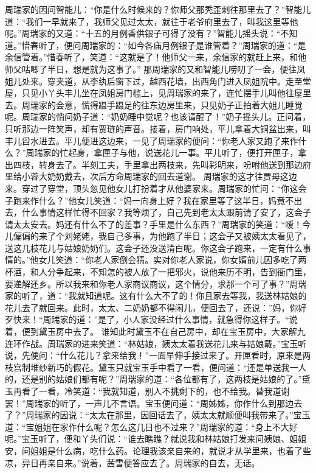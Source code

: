 \documentclass[12pt,oneside]{book}
\begin{document}
周瑞家的因问智能儿：“你是什么时候来的？你师父那秃歪剌往那里去了？”智能儿道：“我们一早就来了，我师父见过太太，就往于老爷府里去了，叫我这里等他呢。”周瑞家的又道：“十五的月例香供银子可得了没有？”智能儿摇头说：“不知道。”惜春听了，便问周瑞家的：“如今各庙月例银子是谁管着？”周瑞家的道：“是余信管着。”惜春听了，笑道：“这就是了！他师父一来，余信家的就赶上来，和他师父咕唧了半日，想是就为这事了。”
那周瑞家的又和智能儿唠叨了一会，便往凤姐儿处来。穿夹道，从李纨后窗下过，越西花墙，出西角门进入凤姐院中。走至堂屋，只见小丫头丰儿坐在凤姐房门槛上，见周瑞家的来了，连忙摆手儿叫他往屋里去。周瑞家的会意，慌得蹑手蹑足的往东边房里来，只见奶子正拍着大姐儿睡觉呢。周瑞家的悄问奶子道：“奶奶睡中觉呢？也该请醒了！”奶子摇头儿。正问着，只听那边一阵笑声，却有贾琏的声音。接着，房门响处，平儿拿着大铜盆出来，叫丰儿舀水进去。平儿便进这边来，一见了周瑞家的便问：“你老人家又跑了来作什么？”周瑞家的忙起身，拿匣子与他，说送花儿一事。平儿听了，便打开匣子，拿出四枝，转身去了。半刻工夫，手里拿出两枝来，先叫彩明来，吩咐他送到那边府里给小蓉大奶奶戴去，次后方命周瑞家的回去道谢。
周瑞家的这才往贾母这边来。穿过了穿堂，顶头忽见他女儿打扮着才从他婆家来。周瑞家的忙问：“你这会子跑来作什么？”他女儿笑道：“妈一向身上好？我在家里等了这半日，妈竟不出去，什么事情这样忙得不回家？我等烦了，自己先到老太太跟前请了安了，这会子请太太安去。妈还有什么不了的差事？手里是什么东西？”周瑞家的笑道：“嗳！今儿偏偏的来了个刘姥姥，我自己多事，为他跑了半日；这会子又被姨太太看见了，送这几枝花儿与姑娘奶奶们。这会子还没送清白呢。你这会子跑来，一定有什么事情的。”他女儿笑道：“你老人家倒会猜。实对你老人家说，你女婿前儿因多吃了两杯酒，和人分争起来，不知怎的被人放了一把邪火，说他来历不明，告到衙门里，要递解还乡。所以我来和你老人家商议商议，这个情分，求那一个可了事？”周瑞家的听了，道：“我就知道呢。这有什么大不了的！你且家去等我，我送林姑娘的花儿去了就回来。此时，太太、二奶奶都不得闲儿，便回去了，还说：”妈，你好歹快来！“周瑞家的道：”是了，小人家没经过什么事情，就急得你这样子。“说着，便到黛玉房中去了。
谁知此时黛玉不在自己房中，却在宝玉房中，大家解九连环作战。周瑞家的进来笑道：“林姑娘，姨太太着我送花儿来与姑娘戴。”宝玉听说，先便问：“什么花儿？拿来给我！”一面早伸手接过来了。开匣看时，原来是两枝宫制堆纱新巧的假花。黛玉只就宝玉手中看了一看，便问道：“还是单送我一人的，还是别的姑娘们都有呢？”周瑞家的道：“各位都有了，这两枝是姑娘的了。”黛玉再看了一看，冷笑道：“我就知道，别人不挑剩下的，也不给我。替我道谢罢！”周瑞家的听了，一声儿不言语。宝玉便问道：“周姊姊，你作什么到那边去了？”周瑞家的因说：“太太在那里，因回话去了，姨太太就顺便叫我带来了。”宝玉道：“宝姐姐在家作什么呢？怎么这几日也不过来？”周瑞家的道：“身上不大好呢。”宝玉听了，便和丫头们说：“谁去瞧瞧？就说我和林姑娘打发来问姨娘、姐姐安，问姐姐是什么病，吃什么药。论理我该亲自来的，就说才从学里来，也着了些凉，异日再亲自来。”说着，茜雪便答应去了。周瑞家的自去，无话。
\end{document}
